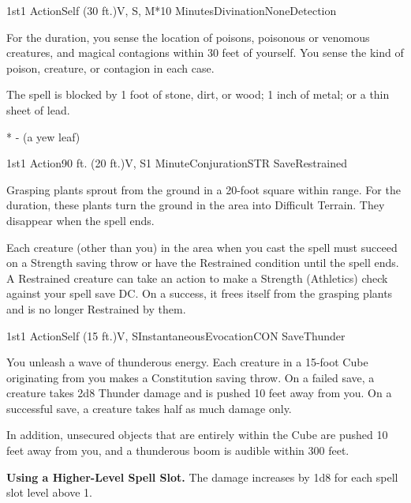 
\begin{Spell}{1st}{1 Action}{Self (30 ft.)}{V, S, M*}{10 Minutes}{Divination}{None}{Detection}

For the duration, you sense the location of poisons, poisonous or venomous creatures, and magical contagions within 30 feet of yourself. You sense the kind of poison, creature, or contagion in each case.

The spell is blocked by 1 foot of stone, dirt, or wood; 1 inch of metal; or a thin sheet of lead.

* - (a yew leaf)

\end{Spell}


\begin{Spell}{1st}{1 Action}{90 ft. (20 ft.)}{V, S}{1 Minute}{Conjuration}{STR Save}{Restrained}

Grasping plants sprout from the ground in a 20-foot square within range. For the duration, these plants turn the ground in the area into Difficult Terrain. They disappear when the spell ends.

Each creature (other than you) in the area when you cast the spell must succeed on a Strength saving throw or have the Restrained condition until the spell ends. A Restrained creature can take an action to make a Strength (Athletics) check against your spell save DC. On a success, it frees itself from the grasping plants and is no longer Restrained by them.

\end{Spell}


\begin{Spell}{1st}{1 Action}{Self (15 ft.)}{V, S}{Instantaneous}{Evocation}{CON Save}{Thunder}

You unleash a wave of thunderous energy. Each creature in a 15-foot Cube originating from you makes a Constitution saving throw. On a failed save, a creature takes 2d8 Thunder damage and is pushed 10 feet away from you. On a successful save, a creature takes half as much damage only.

In addition, unsecured objects that are entirely within the Cube are pushed 10 feet away from you, and a thunderous boom is audible within 300 feet.

\textbf{Using a Higher-Level Spell Slot.} The damage increases by 1d8 for each spell slot level above 1.

\end{Spell}

